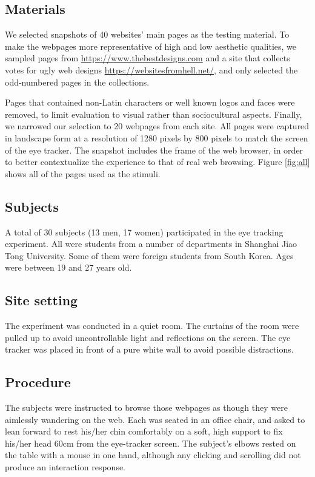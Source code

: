 \subsection{Materials}
We selected snapshots of 40 websites' main pages as the testing material. To make the webpages more representative of high and low aesthetic qualities, we sampled pages from \url{https://www.thebestdesigns.com} and a site that collects votes for ugly web designs \url{https://websitesfromhell.net/}, and only selected the odd-numbered pages in the collections.

Pages that contained non-Latin characters or well known logos and faces were removed, to limit evaluation to visual rather than sociocultural aspects. Finally, we narrowed our selection to 20 webpages from each site. All pages were captured in landscape form at a resolution of  1280 pixels by 800 pixels to match the screen of the eye tracker. The snapshot includes the frame of the web browser, in order to better contextualize the experience to that of real web browsing. Figure \ref{fig:all} shows all of the pages used as the stimuli.

\subsection{Subjects}
A total of 30 subjects (13 men, 17 women) participated in the eye tracking experiment. All were students from a number of departments in Shanghai Jiao Tong University. Some of them were foreign students from South Korea. Ages were between 19 and 27 years old.

\subsection{Site setting}
The experiment was conducted in a quiet room. The curtains of the room were pulled up to avoid uncontrollable light and reflections on the screen. The eye tracker was placed in front of a pure white wall to avoid possible distractions.

\subsection{Procedure}
The subjects were instructed to browse those webpages as though they were aimlessly wandering on the web. Each was seated in an office chair, and asked to lean forward to rest his/her chin comfortably on a soft, high support to fix his/her head 60cm from the eye-tracker screen. The subject's elbows rested on the table with a mouse in one hand, although any clicking and scrolling did not produce an interaction response.

